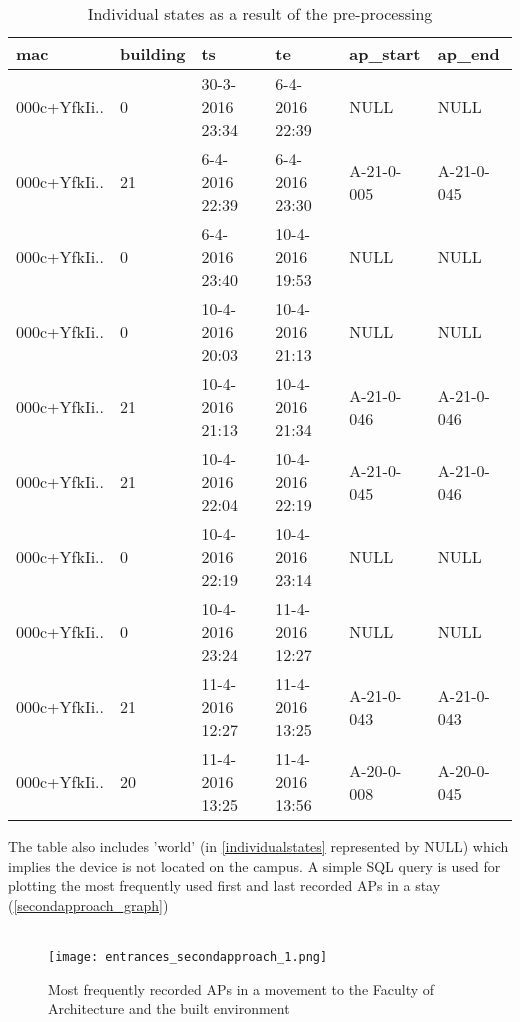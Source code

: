 \begin{table}[H]
	\centering
	\captionsetup{justification=centering}
	\caption{Individual states as a result of the pre-processing}
	\label{individualstates}
	\begin{tabular}{@{}llllll@{}}
		\toprule
		\textbf{mac} & \textbf{building} & \textbf{ts}     & \textbf{te}     & \textbf{ap\_start} & \textbf{ap\_end} \\ \midrule
		000c+YfkIi.. & 0                 & 30-3-2016 23:34 & 6-4-2016 22:39  & NULL               & NULL             \\
		000c+YfkIi.. & 21                & 6-4-2016 22:39  & 6-4-2016 23:30  & A-21-0-005         & A-21-0-045       \\
		000c+YfkIi.. & 0                 & 6-4-2016 23:40  & 10-4-2016 19:53 & NULL               & NULL             \\
		000c+YfkIi.. & 0                 & 10-4-2016 20:03 & 10-4-2016 21:13 & NULL               & NULL             \\
		000c+YfkIi.. & 21                & 10-4-2016 21:13 & 10-4-2016 21:34 & A-21-0-046         & A-21-0-046       \\
		000c+YfkIi.. & 21                & 10-4-2016 22:04 & 10-4-2016 22:19 & A-21-0-045         & A-21-0-046       \\
		000c+YfkIi.. & 0                 & 10-4-2016 22:19 & 10-4-2016 23:14 & NULL               & NULL             \\
		000c+YfkIi.. & 0                 & 10-4-2016 23:24 & 11-4-2016 12:27 & NULL               & NULL             \\
		000c+YfkIi.. & 21                & 11-4-2016 12:27 & 11-4-2016 13:25 & A-21-0-043         & A-21-0-043       \\
		000c+YfkIi.. & 20                & 11-4-2016 13:25 & 11-4-2016 13:56 & A-20-0-008         & A-20-0-045       \\ \bottomrule
	\end{tabular}
\end{table}
The table also includes ’world’ (in \autoref{individualstates} represented by NULL) which implies the device is not located on the campus. A simple SQL query is used for plotting the most frequently used first and last recorded APs in a stay (\autoref{secondapproach_graph})\\\\
\begin{figure}[H]
	\centering
	\texttt{[image: entrances\_secondapproach\_1.png]}
	\captionsetup{justification=centering}
	\caption{Most frequently recorded APs in a movement to the Faculty of Architecture and the built environment}
	\label{secondapproach_graph}
\end{figure}
